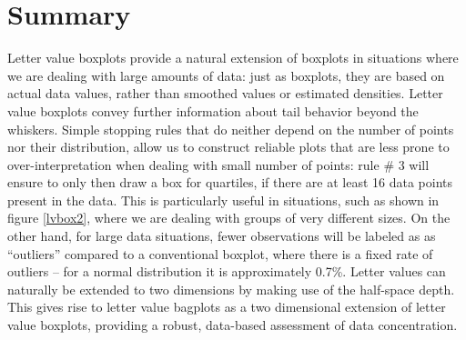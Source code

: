\documentclass[oneside]{article}
\begin{document}
\section{Summary}
\label{sec:summary}

Letter value boxplots provide a natural extension of boxplots in situations where we are dealing with large amounts of data: just as boxplots, they are based on actual data values, rather than smoothed values or estimated densities. Letter value boxplots convey further information about tail behavior beyond the whiskers. Simple stopping rules that do neither depend on the number of points nor their distribution, allow us to construct reliable plots that are less prone to over-interpretation when dealing with small number of points: rule \# 3 will ensure to only then draw a box for quartiles, if there are at least 16 data points present in the data. This is particularly useful in situations, such as shown in figure \ref{lvbox2}, where we are dealing with groups of very different sizes. On the other hand, for large data situations, fewer observations will be labeled as  as ``outliers'' 
compared to a conventional boxplot, where there is a fixed rate of outliers -- for a normal distribution it is approximately 0.7\%.
Letter values can naturally be extended to two dimensions by making use of the half-space depth. This gives rise to letter value bagplots as a two dimensional extension of letter value boxplots, providing a robust, data-based assessment of data concentration. 

%
\end{document}
